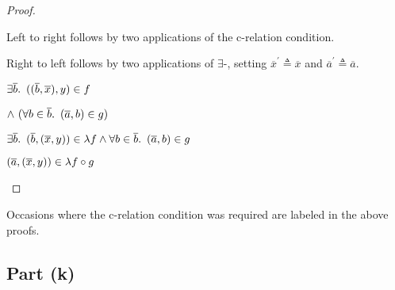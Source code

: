 \begin{prop}
\begin{proof}
\begin{itemize}
    \step
      Left to right follows by two applications of the c-relation condition.

    \step
      Right to left follows by two applications of $\exists$-\Intro, setting $\overline{x}^\prime\triangleq\overline{x}$ and $\overline{a}^\prime\triangleq\overline{a}$.

    \step[\iffs]
      $\exists\overline{b}\ldotp~((\overline{b},\overline{x}),y)\in f$

    \addtolength{\itemsep}{-.2\baselineskip}
    \step
      \quad$\land~(\forall b\in\overline{b}\ldotp~(\overline{a},b)\in g)$
    \addtolength{\itemsep}{.2\baselineskip}

    \step[\iffs]
      $\exists\overline{b}\ldotp~(\overline{b},(\overline{x},y))\in \lambda f\land\forall b\in\overline{b}\ldotp~(\overline{a},b)\in g$
     \marginnote{\Def-$\lambda\cdot$}

    \step[\iffs]
      $(\overline{a},(\overline{x},y))\in\lambda f\circ g$
      \qedhere
    \end{itemize}
  \end{proof}
\end{prop}

Occasions where the c-relation condition was required are labeled in the above proofs.

\subsection{Part (k)}\label{sec:q-2-k}

